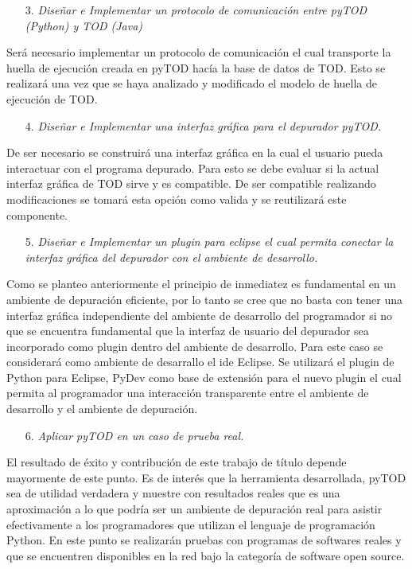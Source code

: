 \documentclass[12pt,a4paper]{report}
\begin{document}
\begin{itemize}
\item[3.] \textit{Diseñar e Implementar un protocolo de comunicación entre pyTOD (Python) y TOD (Java)}
\end{itemize}

Será necesario implementar un protocolo de comunicación el cual transporte la huella de ejecución creada en pyTOD hacía la base de datos de TOD.  Esto se realizará una vez que se haya analizado y modificado el modelo de huella de ejecución de TOD.

\begin{itemize}
\item[4.] \textit{Diseñar e Implementar una interfaz gráfica para el depurador pyTOD.}
\end{itemize}

De ser necesario se construirá una interfaz gráfica en la cual el usuario pueda interactuar con el programa depurado.  Para esto se debe evaluar si la actual interfaz gráfica de TOD sirve y es compatible.  De ser compatible realizando modificaciones se tomará esta opción como valida y se reutilizará este componente.

\begin{itemize}
\item[5.] \textit{Diseñar e Implementar un plugin para eclipse el cual permita conectar la interfaz gráfica del depurador con el ambiente de desarrollo.}
\end{itemize}

Como se planteo anteriormente el principio de inmediatez es fundamental en un ambiente de depuración eficiente, por lo tanto se cree que no basta con tener una interfaz gráfica independiente del ambiente de desarrollo del programador si no que se encuentra fundamental que la interfaz de usuario del depurador sea incorporado como plugin dentro del ambiente de desarrollo.  Para este caso se considerará como ambiente de desarrallo el ide Eclipse.  Se utilizará el plugin de Python para Eclipse, PyDev como base de extensión para el nuevo plugin el cual permita al programador una interacción transparente entre el ambiente de desarrollo y el ambiente de depuración.


\begin{itemize}
\item[6.] \textit{Aplicar pyTOD en un caso de prueba real.}
\end{itemize}

El resultado de éxito y contribución de este trabajo de título depende mayormente de este punto.  Es de interés que la herramienta desarrollada, pyTOD sea de utilidad verdadera y muestre con resultados reales que es una aproximación a lo que podría ser un ambiente de depuración real para asistir efectivamente a los programadores que utilizan el lenguaje de programación Python.  En este punto se realizarán pruebas con programas de softwares reales y que se encuentren disponibles en la red bajo la categoría de software open source.
\end{document}
